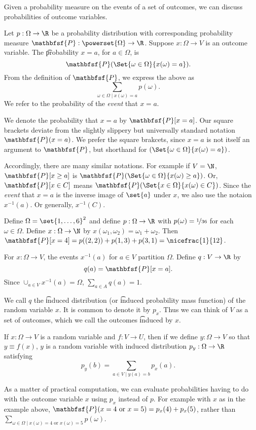 
Given a probability measure on the events of a set of outcomes, we can discuss probabilities of outcome variables.

Let $p: \Omega  \to \R $ be a probability distribution with corresponding probability measure $\mathbfsf{P} : \powerset{\Omega } \to \R $.
Suppose $x: \Omega  \to V$ is an outcome variable.
The \t{probability $x = a$}, for $a \in \Omega $, is
  \[
\textstyle
\mathbfsf{P} (\Set{\omega  \in \Omega }{x(\omega ) = a}).
  \]
From the definition of $\mathbfsf{P} $, we express the above as
  \[
\textstyle
\sum_{\omega  \in \Omega  \mid x(\omega ) = a} p(\omega ).
  \]
We refer to the probability of the \textit{event} that $x = a$.

We denote the probability that $x = a$ by $\mathbfsf{P} [x =a]$.
Our square brackets deviate from the slightly slippery but universally standard notation $\mathbfsf{P} (x = a)$.
We prefer the square brakcets, since $x=a$ is not itself an argument to $\mathbfsf{P} $, but shorthand for $(\Set{\omega  \in \Omega }{x(\omega ) = a})$.

Accordingly, there are many similar notations.
For example if $V = \N $, $\mathbfsf{P} [x \geq a]$ is $\mathbfsf{P} (\Set{\omega  \in \Omega }{x(\omega ) \geq a})$.
Or, $\mathbfsf{P} [x \in C]$ means $\mathbfsf{P} (\Set{x \in \Omega }{x(\omega ) \in C})$.
Since the \textit{event} that $x = a$ is the inverse image of $\set{a}$ under $x$, we also use the notaion $x^{-1}(a)$.
Or generally, $x^{-1}(C)$.

Define $\Omega  = \set{1, \dots, 6}^2$ and define $p: \Omega \to \R $ with $p(\omega ) = \nicefrac{1}{36}$ for each $\omega \in \Omega $.
Define $x: \Omega  \to \N $ by $x(\omega _1, \omega _2) = \omega _1 + \omega _2$.
Then $\mathbfsf{P} [x = 4] = p((2, 2)) + p(1, 3) + p(3, 1) = \nicefrac{1}{12}$.

For $x: \Omega  \to V$, the events $x^{-1}(a)$ for $a \in V$ partition $\Omega $.
Define $q: V \to \R $ by
  \[
q(a) = \mathbfsf{P} [x = a].
  \]
Since $\cup_{a \in V} x^{-1}(a) = \Omega $, $\sum_{a \in A} q(a) = 1$.

We call $q$ the \t{induced distribution} (or \t{induced probability mass function}) of the random variable $x$.
It is common to denote it by $p_{x}$.
Thus we can think of $V$ as a set of outcomes, which we call the outcomes \t{induced} by $x$.

If $x: \Omega  \to V$ is a random variable and $f: V \to U$, then if we define $y: \Omega  \to V$ so that $y \equiv f(x)$, $y$ is a random variable with induced distribution $p_{y}: \Omega  \to \R $ satisfying
  \[
\textstyle
p_{y}(b) = \sum_{a \in V \mid y(a) = b} p_x(a).
  \]

As a matter of practical computation, we can evaluate probabilities having to do with the outcome variable $x$ using $p_x$ instead of $p$.
For example with $x$ as in the example above, $\mathbfsf{P} (x = 4 \text{ or } x = 5) = p_x(4) + p_x(5)$, rather than $\sum_{\omega  \in \Omega  \mid x(\omega ) = 4 \text{ or } x(\omega ) = 5} p(\omega )$.
